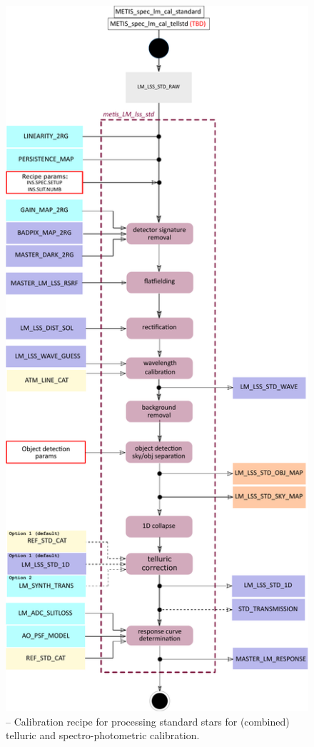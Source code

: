 \begin{figure}[ht]
  \centering
  \includegraphics[width=0.4\textheight]{figures/metis_lm_lss_std_v0.83.pdf}
  \caption[Recipe: ]{ --
    Calibration recipe for processing standard stars for (combined) telluric and  spectro-photometric calibration.}
  \label{Fig:rec_lm_lss_flux1}
\end{figure}
